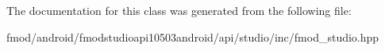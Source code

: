 The documentation for this class was generated from the following file\+:\begin{DoxyCompactItemize}
\item 
fmod/android/fmodstudioapi10503android/api/studio/inc/fmod\+\_\+studio.\+hpp\end{DoxyCompactItemize}
